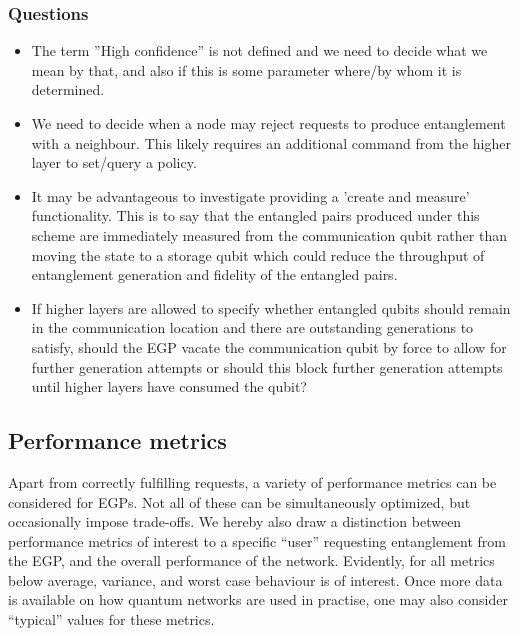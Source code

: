 \documentclass{article}
\begin{document}
\subsubsection{Questions}
\begin{itemize}
\item The term ''High confidence'' is not defined and we need to decide what we mean by that, and also if this is some parameter where/by whom it is determined.
\item We need to decide when a node may reject requests to produce entanglement with a neighbour. This likely requires an additional command from the higher layer to set/query a policy.
\item It may be advantageous to investigate providing a 'create and measure' functionality.  This is to say that the entangled pairs produced under this scheme are immediately measured
      from the communication qubit rather than moving the state to a storage qubit which could reduce the throughput of entanglement generation and fidelity of the entangled pairs.
\item If higher layers are allowed to specify whether entangled qubits should remain in the communication location and there are outstanding generations to satisfy, should the EGP vacate
      the communication qubit by force to allow for further generation attempts or should this block further generation attempts until higher layers have consumed the qubit?
\end{itemize}

\subsection{Performance metrics}

Apart from correctly fulfilling requests, a variety of performance metrics can be considered for EGPs. Not all of these can be simultaneously optimized, but occasionally impose trade-offs.
We hereby also draw a distinction between performance metrics of interest to a specific ``user'' requesting entanglement from the EGP, and the overall performance of the network.
Evidently, for all metrics below average, variance, and worst case behaviour is of interest. Once more data is available on how quantum networks are used in practise, one may also consider ``typical'' values for these metrics.
\end{document}
